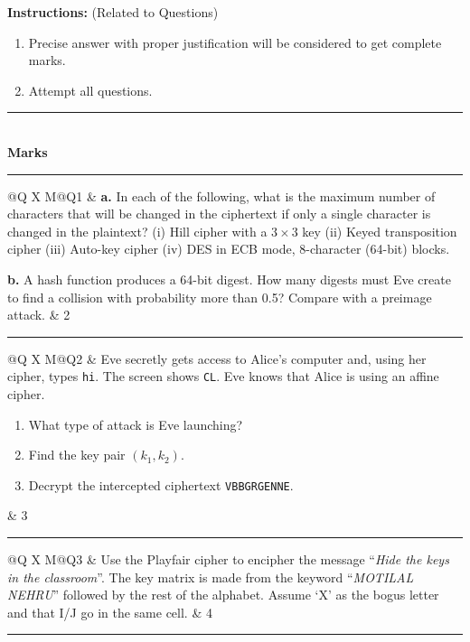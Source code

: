 \documentclass[11pt,a4paper]{article}
\newcommand{\ttx}[1]{\texttt{#1}}
\begin{document}
\vspace{4pt}
\textbf{Instructions:} (Related to Questions)
\begin{enumerate}[leftmargin=2em]
  \item Precise answer with proper justification will be considered to get complete marks.
  \item Attempt all questions.
\end{enumerate}
\vspace{2pt}
\renewcommand{\arraystretch}{1.25}
\newcommand{\qrow}[3]{\par\noindent\begin{tabularx}{\textwidth}{@{}Q X M@{}}#1 & #2 & #3\\\end{tabularx}\par\vspace{2pt}\hrule\vspace{4pt}}
\noindent\rule{\textwidth}{0.8pt}\\\hspace*{\fill}\textbf{Marks}\hspace*{0.2cm}\\[-4pt]\rule{\textwidth}{0.4pt}
\qrow{Q1}{\textbf{a.} In each of the following, what is the maximum number of characters that will be changed in the ciphertext if only a single character is changed in the plaintext? \;(i) Hill cipher with a $3\times3$ key \;(ii) Keyed transposition cipher \;(iii) Auto-key cipher \;(iv) DES in ECB mode, 8-character (64-bit) blocks.

\textbf{b.} A hash function produces a 64-bit digest. How many digests must Eve create to find a collision with probability more than 0.5? Compare with a preimage attack.}{2}
\qrow{Q2}{Eve secretly gets access to Alice's computer and, using her cipher, types \ttx{hi}. The screen shows \ttx{CL}. Eve knows that Alice is using an affine cipher.
\begin{enumerate}[label=\alph*.,leftmargin=1.5em]
  \item What type of attack is Eve launching?
  \item Find the key pair $(k_1, k_2)$.
  \item Decrypt the intercepted ciphertext \ttx{VBBGRGENNE}.
\end{enumerate}}{3}
\qrow{Q3}{Use the Playfair cipher to encipher the message ``\textit{Hide the keys in the classroom}''. The key matrix is made from the keyword ``\textit{MOTILAL NEHRU}'' followed by the rest of the alphabet. Assume `X' as the bogus letter and that I/J go in the same cell.}{4}
\end{document}
